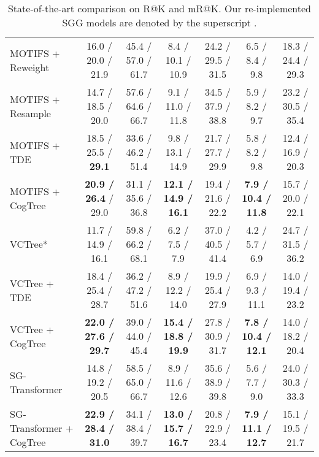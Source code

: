 \documentclass{article}
\begin{document}
\begin{table*}[!ht]
{\begin{tabular}{lcccccc}
\multicolumn{1}{l|}{MOTIFS + Reweight}        & 16.0 / 20.0 / 21.9          &\multicolumn{1}{c|}{ 45.4 / 57.0 / 61.7 }  & 8.4  / 10.1 / 10.9          & \multicolumn{1}{c|}{24.2 / 29.5 / 31.5}  & 6.5 /  8.4  / 9.8          &18.3 / 24.4 / 29.3   \\
\multicolumn{1}{l|}{MOTIFS + Resample}        & 14.7 / 18.5 / 20.0          &\multicolumn{1}{c|}{ 57.6 / 64.6 / 66.7 }  & 9.1  / 11.0 / 11.8          & \multicolumn{1}{c|}{34.5 / 37.9 / 38.8}  & 5.9 /  8.2  / 9.7          &23.2 / 30.5 / 35.4   \\
\multicolumn{1}{l|}{MOTIFS + TDE}             & 18.5 / 25.5 / \textbf{29.1}          &\multicolumn{1}{c|}{ 33.6 / 46.2 / 51.4 }  & 9.8  / 13.1 / 14.9          & \multicolumn{1}{c|}{21.7 / 27.7 / 29.9}  & 5.8 /  8.2  / 9.8          &12.4 / 16.9 / 20.3   \\
\multicolumn{1}{l|}{MOTIFS + CogTree}         & \textbf{20.9 / 26.4} / 29.0 &\multicolumn{1}{c|}{ 31.1 / 35.6 / 36.8 }  & \textbf{12.1 / 14.9 / 16.1} & \multicolumn{1}{c|}{19.4 / 21.6 / 22.2}  & \textbf{7.9 / 10.4 / 11.8} &15.7 / 20.0 / 22.1   \\ \hline
\multicolumn{1}{l|}{VCTree*}                  & 11.7 / 14.9 / 16.1          &\multicolumn{1}{c|}{ 59.8 / 66.2 / 68.1 }  & 6.2  /  7.5  / 7.9          & \multicolumn{1}{c|}{37.0 / 40.5 / 41.4}  & 4.2 /  5.7  / 6.9          &24.7 / 31.5 / 36.2   \\
\multicolumn{1}{l|}{VCTree + TDE}             & 18.4 / 25.4 / 28.7          &\multicolumn{1}{c|}{ 36.2 / 47.2 / 51.6 }  & 8.9  / 12.2 / 14.0          & \multicolumn{1}{c|}{19.9 / 25.4 / 27.9}  & 6.9 /  9.3  / 11.1         &14.0 / 19.4 / 23.2   \\
\multicolumn{1}{l|}{VCTree + CogTree}         & \textbf{22.0 / 27.6 / 29.7} &\multicolumn{1}{c|}{ 39.0 / 44.0 / 45.4 }  & \textbf{15.4 / 18.8 / 19.9} & \multicolumn{1}{c|}{27.8 / 30.9 / 31.7}  & \textbf{7.8 / 10.4 / 12.1} &14.0 / 18.2 / 20.4   \\ \hline
\multicolumn{1}{l|}{SG-Transformer}           & 14.8 / 19.2 / 20.5          &\multicolumn{1}{c|}{ 58.5 / 65.0 / 66.7 }  & 8.9  / 11.6 / 12.6          & \multicolumn{1}{c|}{35.6 / 38.9 / 39.8}  & 5.6 /  7.7  / 9.0          &24.0 / 30.3 / 33.3   \\
\multicolumn{1}{l|}{SG-Transformer + CogTree} & \textbf{22.9 / 28.4 / 31.0} &\multicolumn{1}{c|}{ 34.1 / 38.4 / 39.7 }  & \textbf{13.0 / 15.7 / 16.7} & \multicolumn{1}{c|}{20.8 / 22.9 / 23.4}  & \textbf{7.9 / 11.1 / 12.7} &15.1 / 19.5 / 21.7   \\ \hline
\end{tabular}}    
\caption{State-of-the-art comparison on R@K and mR@K. Our re-implemented SGG models are denoted by the superscript .}
\label{tab:sota}
\end{table*}
\end{document}
